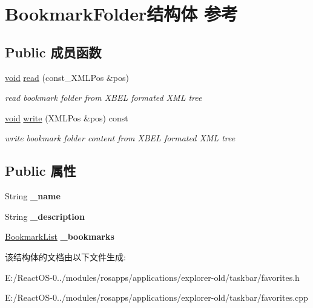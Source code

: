 \hypertarget{struct_bookmark_folder}{}\section{Bookmark\+Folder结构体 参考}
\label{struct_bookmark_folder}
\subsection*{Public 成员函数}
\begin{DoxyCompactItemize}
\item 
\mbox{\label{struct_bookmark_folder_a46c9711f604e530ec0414e8a678861f5}} 
\hyperlink{interfacevoid}{void} \hyperlink{struct_bookmark_folder_a46c9711f604e530ec0414e8a678861f5}{read} (const\+\_\+\+X\+M\+L\+Pos \&pos)
\begin{DoxyCompactList}\small\item\em read bookmark folder from X\+B\+EL formated X\+ML tree \end{DoxyCompactList}\item 
\mbox{\label{struct_bookmark_folder_a0881023d75437b019a75993a7ccddbb1}} 
\hyperlink{interfacevoid}{void} \hyperlink{struct_bookmark_folder_a0881023d75437b019a75993a7ccddbb1}{write} (X\+M\+L\+Pos \&pos) const
\begin{DoxyCompactList}\small\item\em write bookmark folder content from X\+B\+EL formated X\+ML tree \end{DoxyCompactList}\end{DoxyCompactItemize}
\subsection*{Public 属性}
\begin{DoxyCompactItemize}
\item 
\mbox{\label{struct_bookmark_folder_aa85765f619eaa15dc5c3bfbae39a441b}} 
String {\bfseries \+\_\+name}
\item 
\mbox{\label{struct_bookmark_folder_a96769090ef3e161ca94adc071337dee2}} 
String {\bfseries \+\_\+description}
\item 
\mbox{\label{struct_bookmark_folder_ab8c72abf1c6723b82ff8eefc9199034d}} 
\hyperlink{struct_bookmark_list}{Bookmark\+List} {\bfseries \+\_\+bookmarks}
\end{DoxyCompactItemize}


该结构体的文档由以下文件生成\+:\begin{DoxyCompactItemize}
\item 
E\+:/\+React\+O\+S-\/0../modules/rosapps/applications/explorer-\/old/taskbar/favorites.\+h\item 
E\+:/\+React\+O\+S-\/0../modules/rosapps/applications/explorer-\/old/taskbar/favorites.\+cpp\end{DoxyCompactItemize}
